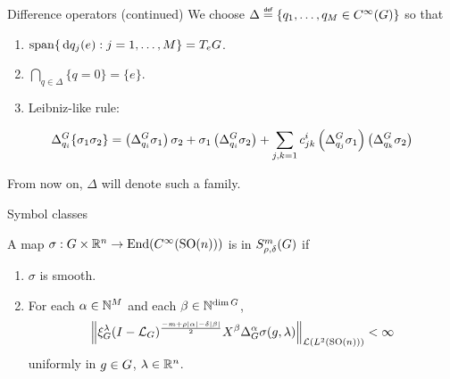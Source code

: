 \documentclass{beamer}
\begin{document}
\begin{frame}{Difference operators (continued)}
    We choose $\Delta \defeq \{q_1, \dots, q_M \in \SmoothFunctions \Group\}$ so that
    \begin{enumerate}
        \item
            $\operatorname{span} \{\,\mathrm{d} q_j(e) : j = 1, \dots, M\} = T_e G$.
            \pause
        \item
            $\bigcap_{q \in \Delta} \{q = 0\} = \{e\}$.
            \pause
        \item
            Leibniz-like rule:
    \end{enumerate}
    \begin{align*}
        {\Delta^{G}_{q_i}} \{\sigma_1 \sigma_2\}
        =
        \left({\Delta^{G}_{q_i}} \sigma_1 \right) \sigma_2
        + \sigma_1 \left({\Delta^{G}_{q_i}} \sigma_2\right)
        + \sum_{j, k = 1} c^i_{j k} \left({\Delta^{G}_{q_j}} \sigma_1\right) \left({\Delta^{G}_{q_k}} \sigma_2\right)
    \end{align*}

    \pause

    From now on,
    $\Delta$ will denote such a family.
\end{frame}

\begin{frame}{Symbol classes}
    \begin{definition}
        A map $\sigma: G \times \mathbb{R}^n \to \operatorname{End} ({C^\infty({\mathrm{SO} (n)})})$ is in $S^{m}_{\rho, \delta}(G)$ if
        \begin{enumerate}
            \item
                $\sigma$ is smooth.
            \item
                For each $\alpha \in \mathbb{N}^M$ and each $\beta \in \mathbb{N}^{\dim G}$,
                \begin{align*}
                    \norm [\Lin {\Lebesgue 2 {\SpecialOrthogonalGroup n}}] {
                        \Rep \lambda \BesselPotential {-m + \rho \abs \alpha - \delta \abs \beta}
                        \LeftDifferentialOperator \beta \DifferenceOperatorOrder \alpha \sigma(g, \lambda)
                    } < \infty
                \end{align*}
                uniformly in $g \in G$, $\lambda \in \mathbb{R}^n$.
        \end{enumerate}
    \end{definition}
\end{frame}
\end{document}
